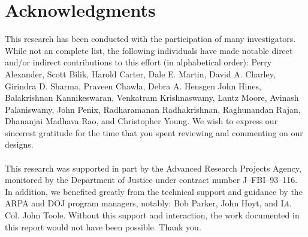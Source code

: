 \documentclass[11pt]{report}
\begin{document}
\chapter{Acknowledgments}
This research has been conducted with the participation of many
investigators.  While not an complete list, the following individuals
have made notable direct and/or indirect contributions to this effort
(in alphabetical order):
Perry Alexander,
Scott Bilik,
Harold Carter,
Dale E. Martin,
David A. Charley,
Girindra D. Sharma,
Praveen Chawla,
Debra A. Hensgen
John Hines,
Balakrishnan Kannikeswaran,
Venkatram Krishnaswamy,
Lantz Moore,
Avinash Palaniswamy,
John Penix,
Radharamanan Radhakrishnan,
Raghunandan Rajan, 
Dhananjai Madhava Rao, and
Christopher Young.
We wish to express our sincerest gratitude for the time that you spent
reviewing and commenting on our designs.
\\
\\
This research was supported in part by the Advanced Research Projects
Agency, monitored by the Department of Justice under contract number
J--FBI--93--116.  In addition, we benefited greatly from the technical
support and guidance by the ARPA and DOJ program managers, notably: Bob
Parker, John Hoyt, and Lt. Col. John Toole.  Without this support and
interaction, the work documented in this report would not have been
possible.  Thank you.
\end{document}

